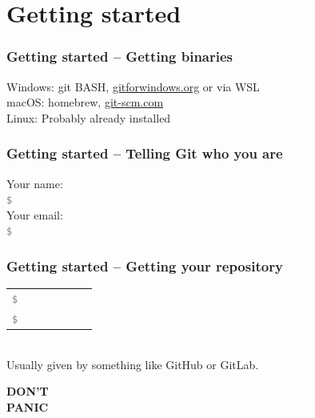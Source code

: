 \documentclass{beamer}
\newcommand{\command}[1]{\colorbox{black!78}{\vphantom{Ep}\texttt{\textcolor{gray}{\$}
\textcolor{white}{#1}}}}
\begin{document}
\section{Getting started}

\begin{frame}[fragile]
  \frametitle{Getting started -- Getting binaries}
  
  Windows: git BASH, \url{gitforwindows.org} or via WSL\\
  macOS: homebrew, \url{git-scm.com}\\
  Linux: Probably already installed\\

\end{frame}

\begin{frame}[fragile]
  \frametitle{Getting started -- Telling Git who you are}

  Your name:\\
  \command{git config --global user.name "kodapan"} \\[1em]

  Your email:\\
  \command{git config --global user.email "kodapan@lithekod.se"} \\

\end{frame}

\begin{frame}[fragile]
  \frametitle{Getting started -- Getting your repository}
  \begin{tabular}{ll}
    \command{git clone} & \\
    \command{git init} & \\
  \end{tabular} \\
  \vspace{1em}
  Usually given by something like GitHub or GitLab.
\end{frame}

\begin{frame}[fragile]
  \begin{center}
      \Huge \bfseries \textcolor{lkblue}{DON'T\\PANIC}
  \end{center}
\end{frame}

\end{document}
